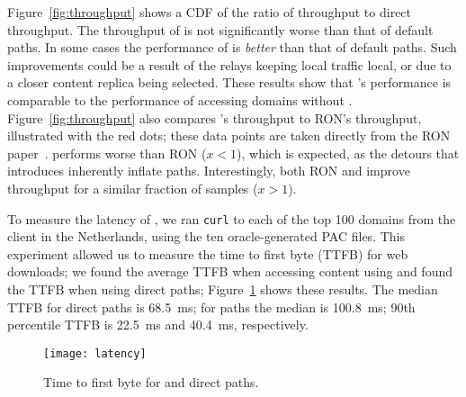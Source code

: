 Figure~\ref{fig:throughput} shows a CDF of the ratio of \system{}
throughput to direct throughput.  The throughput of
\system{} is not significantly worse than that of default paths.  
In some cases the performance of \system{} is {\it better} than
that of default paths.  Such improvements could be a result of the
relays keeping local traffic local, or due to a closer content replica
being selected.  These results show that \system{}'s performance is
comparable to the performance of accessing domains without \system{}.
Figure~\ref{fig:throughput} also compares \system{}'s throughput to
RON's throughput, illustrated with the red dots; these data points are taken 
directly from the RON paper~\cite{andersen2001resilient}.  \system{} performs
worse than RON ($x < 1$), which is expected, as the detours that
\system{} introduces inherently inflate paths.  Interestingly, both
RON and \system{} improve throughput for a similar fraction of samples
($x>1$).

To measure the latency of \system{}, we ran {\tt curl} to each of the  top 100
domains from the client in the Netherlands, using the ten oracle-generated PAC
files. This experiment
allowed us to measure the time to first byte (TTFB) for web downloads; we
found the average TTFB when accessing content using \system{} and  found the
TTFB when using direct paths; 
Figure~\ref{fig:latency} shows these results. The median TTFB for direct paths is
68.5~ms; for
\system{} paths the median is 100.8~ms; 90th percentile TTFB is 22.5~ms and
40.4~ms, respectively.


\begin{figure}[t]
\centering
\texttt{[image: latency]}
\caption{Time to first byte for \system{} and direct paths.}
\label{fig:latency}
\end{figure}




